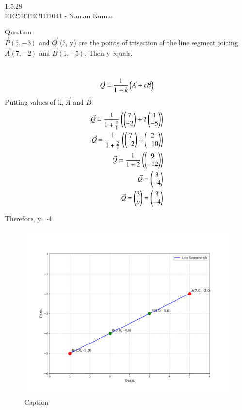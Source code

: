 \documentclass[a4paper, 11pt]{article}
\author{EE25BTECH11041-Naman Kumar }
\begin{document}
\begin{center}
    \huge{1.5.28}\\
    \large{EE25BTECH11041 - Naman Kumar}
\end{center}
Question:\\
$\Vec{P} (5, -3)$ and $\Vec{Q}$ (3, y) are the points of trisection of the line segment joining $\Vec{A} (7, -2)$ and $\Vec{B} (1, -5)$. Then y equals.

\solution \\
\begin{align}
\Vec{Q}=\frac{1}{1+k}\brak{\Vec{A}+k\Vec{B}}\\
\end{align}
Putting values of k, $\Vec{A}$ and $\Vec{B}$\\
\begin{align}
\Vec{Q}=\frac{1}{1+\frac{2}{1}}\brak{\myvec{7\\-2}+2\myvec{1\\-5}}\\
\Vec{Q}=\frac{1}{1+\frac{2}{1}}\brak{\myvec{7\\-2}+\myvec{2\\-10}}\\
\Vec{Q}=\frac{1}{1+2}\brak{\myvec{9\\-12}}\\
\Vec{Q}=\myvec{3\\-4}\\
\Vec{Q}=\myvec{3\\y}=\myvec{3\\-4}
\end{align}
\begin{center}
Therefore, y=-4
\end{center}
\newpage
\begin{figure}
    \centering
    \includegraphics[width=\columnwidth]{figs/trisection_diagram.png}
    \caption{Caption}
    \label{fig:placeholder}
\end{figure}
\end{document}
